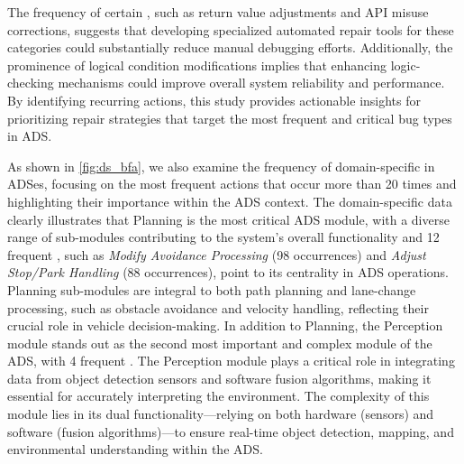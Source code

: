 {The frequency of certain \bfas, such as return value adjustments and API misuse corrections, suggests that developing specialized automated repair tools for these categories could substantially reduce manual debugging efforts. Additionally, the prominence of logical condition modifications implies that enhancing logic-checking mechanisms could improve overall system reliability and performance.
By identifying recurring actions, this study provides actionable insights for prioritizing repair strategies that target the most frequent and critical bug types in ADS.



\vspace{-1ex}
\begin{finding}
\label{finding:rq2_di_bfa}
\end{finding}
\vspace{-1ex}
}


As shown in \autoref{fig:ds_bfa}, we also examine the frequency of domain-specific \bfas in ADSes, focusing on the most frequent actions that occur more than 20 times and highlighting their importance within the ADS context. 
The domain-specific data clearly illustrates that Planning is the most critical ADS module, with a diverse range of sub-modules contributing to the system's overall functionality and 12 frequent \bfas, such as \textit{Modify Avoidance Processing} (98 occurrences) and \textit{Adjust Stop/Park Handling} (88 occurrences), point to its centrality in ADS operations. Planning sub-modules are integral to both path planning and lane-change processing, such as obstacle avoidance and velocity handling, reflecting their crucial role in vehicle decision-making. In addition to Planning, the Perception module stands out as the second most important and complex module of the ADS, with 4 frequent \bfas. The Perception module plays a critical role in integrating data from object detection sensors and software fusion algorithms, making it essential for accurately interpreting the environment. The complexity of this module lies in its dual functionality—relying on both hardware (sensors) and software (fusion algorithms)—to ensure real-time object detection, mapping, and environmental understanding within the ADS.


